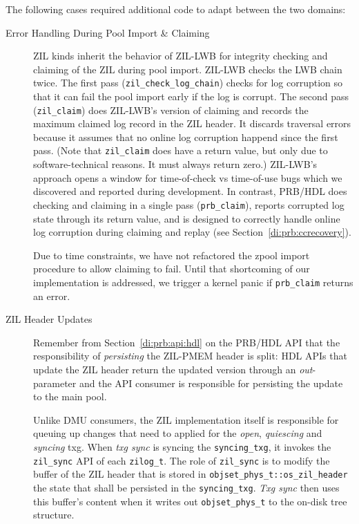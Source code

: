 \documentclass[12pt,a4paper,twoside]{book}
\begin{document}
The following cases required additional code to adapt between the two domains:
\begin{description}
    \item[Error Handling During Pool Import \& Claiming]
        ZIL kinds inherit the behavior of ZIL-LWB for integrity checking and claiming of the ZIL during pool import.
        ZIL-LWB checks the LWB chain twice.
        The first pass (\lstinline{zil_check_log_chain}) checks for log corruption so that it can fail the pool import early if the log is corrupt.
        The second pass (\lstinline{zil_claim}) does ZIL-LWB's version of claiming and records the maximum claimed log record in the ZIL header.
        It discards traversal errors because it assumes that no online log corruption happend since the first pass.
        (Note that \lstinline{zil_claim} does have a return value, but only due to software-technical reasons. It must always return zero.)
        ZIL-LWB's approach opens a window for time-of-check vs time-of-use bugs which we discovered and reported during development.
        In contrast, PRB/HDL does checking and claiming in a single pass (\lstinline{prb_claim}), reports corrupted log state through its return value, and is designed to correctly handle online log corruption during claiming and replay (see Section~\ref{di:prb:ccrecovery}).

        Due to time constraints, we have not refactored the zpool import procedure to allow claiming to fail.
        Until that shortcoming of our implementation is addressed, we trigger a kernel panic if \lstinline{prb_claim} returns an error.

    \item[ZIL Header Updates]
        Remember from Section~\ref{di:prb:api:hdl} on the PRB/HDL API that the responsibility of \textit{persisting} the ZIL-PMEM header is split:
        HDL APIs that update the ZIL header return the updated version through an \textit{out}-parameter and the API consumer is responsible for persisting the update to the main pool.

        Unlike DMU consumers, the ZIL implementation itself is responsible for queuing up changes that need to applied for the \textit{open}, \textit{quiescing} and \textit{syncing} txg.
        When \textit{txg sync} is syncing the \lstinline{syncing_txg}, it invokes the \lstinline{zil_sync} API of each \lstinline{zilog_t}.
        The role of \lstinline{zil_sync} is to modify the buffer of the ZIL header that is stored in \lstinline{objset_phys_t::os_zil_header} the state that shall be persisted in the \lstinline{syncing_txg}.
        \textit{Txg sync} then uses this buffer's content when it writes out \lstinline{objset_phys_t} to the on-disk tree structure.


\end{description}
\end{document}
